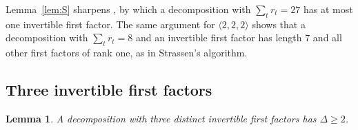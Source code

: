 \documentclass[11pt]{amsart}
\newtheorem{lemma}[theorem]{Lemma}
\theoremstyle{definition}
\theoremstyle{remark}
\numberwithin{equation}{section}
\begin{document}
Lemma~\ref{lem:S} sharpens \cite[Proposition~5.3 and Corollary~6.1]{Yan26}, by which a decomposition with $\sum_tr_t=27$ has at most one invertible first factor. The same argument for $\langle 2,2,2\rangle$ shows that a decomposition with $\sum_t r_t=8$ and an invertible first factor has length $7$ and all other first factors of rank one, as in Strassen's algorithm.

\subsection{Three invertible first factors}

\begin{lemma}\label{lem:S3}
A decomposition with three distinct invertible first factors has $\Delta\ge 2$.
\end{lemma}
\end{document}
